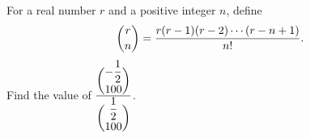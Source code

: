 For a real number $r$ and a positive integer $n$, define
\[
\dbinom rn=\dfrac{r(r-1)(r-2)\cdots(r-n+1)}{n!}.
\]
Find the value of $\dfrac{\dbinom{-\dfrac{1}{2}}{100}}{\dbinom{\dfrac{1}{2}}{100}}$.
